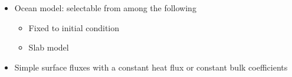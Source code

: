 \begin{itemize}
  \begin{itemize}
    \item Ocean model: selectable from among the following
    \begin{itemize}
      \item Fixed to initial condition
      \item Slab model
    \end{itemize}
    \item Simple surface fluxes with a constant heat flux or constant bulk coefficients
  \end{itemize}
\end{itemize}
